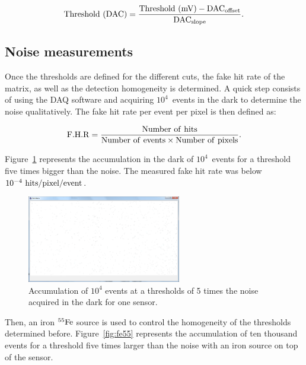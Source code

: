   \begin{equation}
    \rm{Threshold~(DAC)} = \frac{\rm{Threshold~(mV)} - \rm{DAC}_{\rm{offset}}}{\rm{DAC}_{\rm{slope}}}.
  \end{equation}

  \subsection{Noise measurements}

  Once the thresholds are defined for the different cuts, the fake hit rate of the matrix, as well as the detection homogeneity is determined.
  A quick step consists of using the \gls{DAQ} software and acquiring $10^4$~events in the dark to determine the noise qualitatively. 
  The fake hit rate per event per pixel is then defined as:

  \begin{equation}
    \rm{F.H.R} = \frac{\rm{Number~of~hits}}{\rm{Number~of~events} \times \rm{Number~of~pixels}}. 
  \end{equation}
  
  Figure~\ref{fig:darkEvents} represents the accumulation in the dark of $10^4$~events for a threshold five times bigger than the noise.
  The measured fake hit rate was below $10^{-4}~\rm{hits/pixel/event}$.

   \begin{figure}[!tbh]
    \centering
    \includegraphics[width=0.6\textwidth]{Pictures/labTests/dark_10kEvents_not_noisy.png}
    \caption{Accumulation of $10^4$ events at a thresholds of 5 times the noise acquired in the dark for one sensor.}
    \label{fig:darkEvents}
  \end{figure}

  Then, an iron $^{55}\rm{Fe}$ source is used to control the homogeneity of the thresholds determined before.
  Figure~\ref{fig:fe55} represents the accumulation of ten thousand events for a threshold five times larger than the noise with an iron source on top of the sensor.
  
